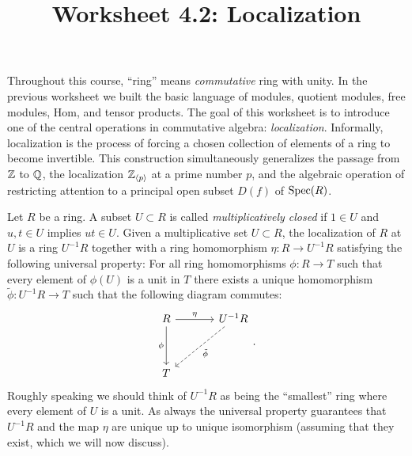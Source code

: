 \documentclass[12pt,reqno]{amsart}
\title{Worksheet 4.2: Localization}
\begin{document}

\maketitle
\thispagestyle{firstpage}

Throughout this course, ``ring'' means \textit{commutative} ring with unity. In the previous worksheet we built the basic language of modules, quotient modules, free modules, Hom, and tensor products. The goal of this worksheet is to introduce one of the central operations in commutative algebra: \emph{localization}. Informally, localization is the process of forcing a chosen collection of elements of a ring to become invertible. This construction simultaneously generalizes the passage from $\mathbb{Z}$ to $\mathbb{Q}$, the localization $\mathbb{Z}_{\langle p\rangle}$ at a prime number $p$, and the algebraic operation of restricting attention to a principal open subset $D(f)$ of $\operatorname{Spec}(R)$.

Let $R$ be a ring. A subset $U \subset R$ is called \emph{multiplicatively closed} if $1\in U$ and $u,t\in U$ implies $ut\in U$. Given a multiplicative set $U \subset R$, the localization of $R$ at $U$ is a ring $U^{-1}R$ together with a ring homomorphism $\eta: R \to U^{-1}R$ satisfying the following universal property: For all ring homomorphisms $\phi:R \to T$ such that every element of $\phi(U)$ is a unit in $T$ there exists a unique homomorphism $\tilde{\phi}:U^{-1}R \to T$ such that the following diagram commutes:
\[
\begin{tikzcd}[row sep = 3.5em, column sep = 3.5em]
R \arrow[r, "\eta"] \arrow[d, swap, "\phi"] & U^{-1}R  \arrow[dl, dashed,"\tilde{\phi}"] \\
T & 
\end{tikzcd}.
\]
Roughly speaking we should think of $U^{-1}R$ as being the ``smallest'' ring where every element of $U$ is a unit.  As always the universal property guarantees that $U^{-1}R$ and the map $\eta$ are unique up to unique isomorphism (assuming that they exist, which we will now discuss). 
\end{document}
